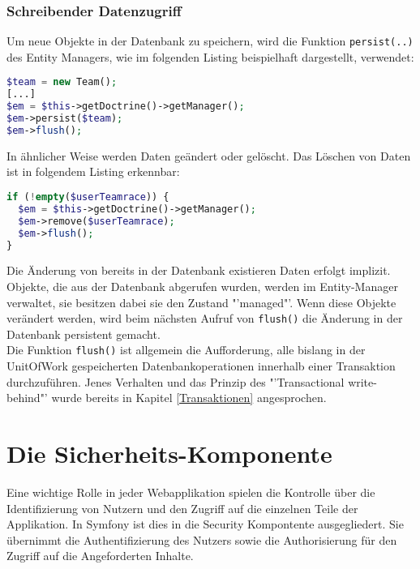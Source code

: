 \documentclass[12pt]{report}
\begin{document}
\subsubsection{Schreibender Datenzugriff}
Um neue Objekte in der Datenbank zu speichern, wird die Funktion \texttt{persist(..)} des Entity Managers, wie im folgenden Listing beispielhaft dargestellt, verwendet:
\begin{lstlisting}[language=php, caption=Auszug aus \\src/TeamRace/WebBundle/Controller/TeamraceController.php, showstringspaces=false]
$team = new Team();
[...]    	
$em = $this->getDoctrine()->getManager();
$em->persist($team);
$em->flush();
\end{lstlisting}
In ähnlicher Weise werden Daten geändert oder gelöscht. Das Löschen von Daten ist in folgendem Listing erkennbar:
\begin{lstlisting}[language=php, caption=Auszug aus \\src/TeamRace/WebBundle/Controller/TeamraceController.php, showstringspaces=false]
if (!empty($userTeamrace)) {
  $em = $this->getDoctrine()->getManager();
  $em->remove($userTeamrace);
  $em->flush();
}
\end{lstlisting}
Die Änderung von bereits in der Datenbank existieren Daten erfolgt implizit. Objekte, die aus der Datenbank abgerufen wurden, werden im Entity-Manager verwaltet, sie besitzen dabei sie den Zustand "'managed"'. Wenn diese Objekte verändert werden, wird beim nächsten Aufruf von \texttt{flush()} die Änderung in der Datenbank persistent gemacht.\\

Die Funktion \texttt{flush()} ist allgemein die Aufforderung, alle bislang in der UnitOfWork gespeicherten Datenbankoperationen innerhalb einer Transaktion durchzuführen. Jenes Verhalten und das Prinzip des "'Transactional write-behind"' wurde bereits in Kapitel \ref{Transaktionen} angesprochen.\\

\section{Die Sicherheits-Komponente}

Eine wichtige Rolle in jeder Webapplikation spielen die Kontrolle über die Identifizierung von Nutzern und den Zugriff auf die einzelnen Teile der Applikation. In Symfony ist dies in die Security Kompontente ausgegliedert. Sie übernimmt die Authentifizierung des Nutzers sowie die Authorisierung für den Zugriff auf die Angeforderten Inhalte.
\end{document}
